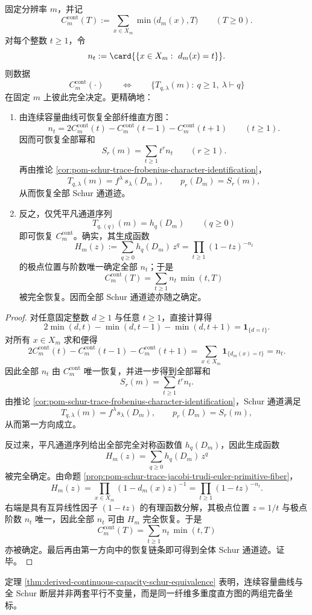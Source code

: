 \begin{theorem}\label{thm:derived-continuous-capacity-schur-equivalence}
固定分辨率 \(m\)，并记
\[
C_m^{\mathrm{cont}}(T):=\sum_{x\in X_m}\min\bigl(d_m(x),T\bigr)
\qquad (T\ge 0).
\]
对每个整数 \(t\ge 1\)，令
\[
n_t:=\card{\{x\in X_m:\ d_m(x)=t\}}.
\]
则数据
\[
C_m^{\mathrm{cont}}(\cdot)
\qquad\Longleftrightarrow\qquad
\bigl\{T_{q,\lambda}(m):\ q\ge 1,\ \lambda\vdash q\bigr\}
\]
在固定 \(m\) 上彼此完全决定。更精确地：
\begin{enumerate}
  \item 由连续容量曲线可恢复全部纤维直方图：
  \[
  n_t
  =
  2C_m^{\mathrm{cont}}(t)-C_m^{\mathrm{cont}}(t-1)-C_m^{\mathrm{cont}}(t+1)
  \qquad (t\ge 1).
  \]
  因而可恢复全部幂和
  \[
  S_r(m)=\sum_{t\ge 1} t^r n_t
  \qquad (r\ge 1).
  \]
  再由推论 \ref{cor:pom-schur-trace-frobenius-character-identification}，
  \[
  T_{q,\lambda}(m)=f^\lambda\,s_\lambda(D_m),
  \qquad
  p_r(D_m)=S_r(m),
  \]
  从而恢复全部 Schur 通道迹。
  \item 反之，仅凭平凡通道序列
  \[
  T_{q,(q)}(m)=h_q(D_m)
  \qquad (q\ge 0)
  \]
  即可恢复 \(C_m^{\mathrm{cont}}\)。确实，其生成函数
  \[
  H_m(z):=\sum_{q\ge 0}h_q(D_m)\,z^q
  =\prod_{t\ge 1}(1-tz)^{-n_t}
  \]
  的极点位置与阶数唯一确定全部 \(n_t\)；于是
  \[
  C_m^{\mathrm{cont}}(T)=\sum_{t\ge 1} n_t\,\min(t,T)
  \]
  被完全恢复。因而全部 Schur 通道迹亦随之确定。
\end{enumerate}
\end{theorem}
\begin{proof}
对任意固定整数 \(d\ge 1\) 与任意 \(t\ge 1\)，直接计算得
\[
2\min(d,t)-\min(d,t-1)-\min(d,t+1)=\mathbf 1_{\{d=t\}}.
\]
对所有 \(x\in X_m\) 求和便得
\[
2C_m^{\mathrm{cont}}(t)-C_m^{\mathrm{cont}}(t-1)-C_m^{\mathrm{cont}}(t+1)
=
\sum_{x\in X_m}\mathbf 1_{\{d_m(x)=t\}}
=
n_t.
\]
因此全部 \(n_t\) 由 \(C_m^{\mathrm{cont}}\) 唯一恢复，并进一步得到全部幂和
\[
S_r(m)=\sum_{t\ge 1} t^r n_t.
\]
由推论 \ref{cor:pom-schur-trace-frobenius-character-identification}，Schur 通道满足
\[
T_{q,\lambda}(m)=f^\lambda s_\lambda(D_m),
\qquad
p_r(D_m)=S_r(m),
\]
从而第一方向成立。

反过来，平凡通道序列给出全部完全对称函数值 \(h_q(D_m)\)，因此生成函数
\[
H_m(z)=\sum_{q\ge 0}h_q(D_m)\,z^q
\]
被完全确定。由命题 \ref{prop:pom-schur-trace-jacobi-trudi-euler-primitive-fiber}，
\[
H_m(z)=\prod_{x\in X_m}(1-d_m(x)z)^{-1}
=
\prod_{t\ge 1}(1-tz)^{-n_t}.
\]
右端是具有互异线性因子 \((1-tz)\) 的有理函数分解，其极点位置 \(z=1/t\) 与极点阶数 \(n_t\) 唯一，因此全部 \(n_t\) 可由 \(H_m\) 完全恢复。于是
\[
C_m^{\mathrm{cont}}(T)=\sum_{t\ge 1} n_t\,\min(t,T)
\]
亦被确定。最后再由第一方向中的恢复链条即可得到全体 Schur 通道迹。证毕。
\end{proof}

\begin{remark}\label{rem:derived-capacity-schur-complete-coordinates}
定理 \ref{thm:derived-continuous-capacity-schur-equivalence} 表明，连续容量曲线与全 Schur 断层并非两套平行不变量，而是同一纤维多重度直方图的两组完备坐标。
\end{remark}
